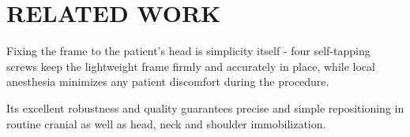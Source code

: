 
\section{RELATED WORK}
\label{sec:relatedWork}

Fixing the frame to the patient’s head is simplicity itself - four self-tapping 
screws keep the lightweight frame firmly and accurately in place, while local 
anesthesia minimizes any patient discomfort during the procedure.

Its excellent robustness and quality guarantees precise and simple 
repositioning in routine cranial as well as head, neck and shoulder 
immobilization.